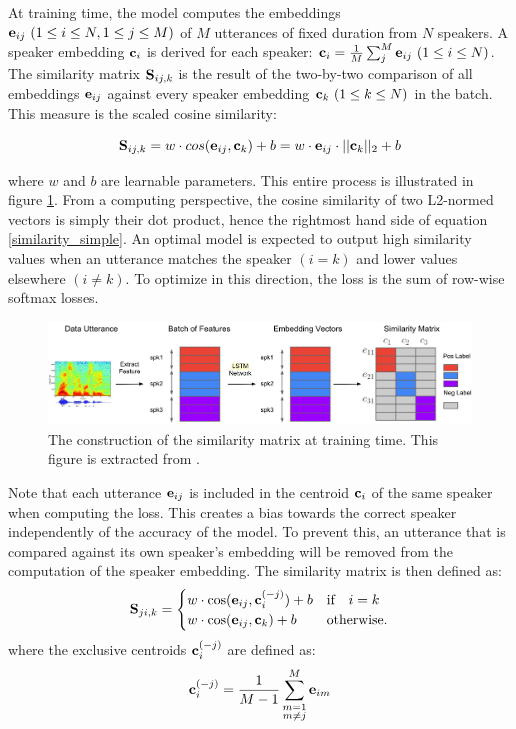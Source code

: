 \documentclass[a4paper, oneside, 12pt, english]{article}
\begin{document}
At training time, the model computes the embeddings $\mathbf{e}_{ij}\ (1 \leq i \leq N, 1 \leq j \leq M)$ of $M$ utterances of fixed duration from $N$ speakers. A speaker embedding $\mathbf{c}_i$ is derived for each speaker: $\mathbf{c}_i=\frac{1}{M}\sum_{j}^{M}\mathbf{e}_{ij}\ (1 \leq i \leq N)$. The similarity matrix $\mathbf{S}_{ij,k}$ is the result of the two-by-two comparison of all embeddings $\mathbf{e}_{ij}$ against every speaker embedding $\mathbf{c}_{k}\ (1 \leq k \leq N)$ in the batch. This measure is the scaled cosine similarity:

\begin{equation} \label{similarity_simple}
	\mathbf{S}_{ij,k} = w \cdot cos(\mathbf{e}_{ij}, \mathbf{c}_{k}) + b = w \cdot \mathbf{e}_{ij} \cdot ||\mathbf{c}_{k}||_2 + b
\end{equation}

where $w$ and $b$ are learnable parameters. This entire process is illustrated in figure \ref{sim_matrix}.  From a computing perspective, the cosine similarity of two L2-normed vectors is simply their dot product, hence the rightmost hand side of equation \ref{similarity_simple}. An optimal model is expected to output high similarity values when an utterance matches the speaker $(i = k)$ and lower values elsewhere $(i \neq k)$. To optimize in this direction, the loss is the sum of row-wise softmax losses.

\begin{figure}[h]
	\centering
	\includegraphics[width=\linewidth]{images/sim_matrix.png}
	\caption{The construction of the similarity matrix at training time. This figure is extracted from \citep{GE2E}.}
	\label{sim_matrix}
\end{figure}

Note that each utterance $\mathbf{e}_{ij}$ is included in the centroid $\mathbf{c}_{i}$ of the same speaker when computing the loss. This creates a bias towards the correct speaker independently of the accuracy of the model. To prevent this, an utterance that is compared against its own speaker's embedding will be removed from the computation of the speaker embedding. The similarity matrix is then defined as:
\begin{equation} \label{similarity_exclusive}
\mathbf{S}_{ji,k} =
\begin{cases}
w\cdot \cos(\mathbf{e}_{ij}, \mathbf{c}_i^{(-j)})+b & \text{if} \quad i=k \\
w\cdot \cos(\mathbf{e}_{ij}, \mathbf{c}_k)+b & \text{otherwise}.
\end{cases}
\end{equation}
where the exclusive centroids $\mathbf{c}_{i}^{(-j)}$ are defined as:
\begin{equation} \label{exclusive_centroid}
\mathbf{c}_{i}^{(-j)} = \frac{1}{M-1}\sum_{\substack{m=1\\m\neq j}}^{M}\mathbf{e}_{im}
\end{equation}
\end{document}
